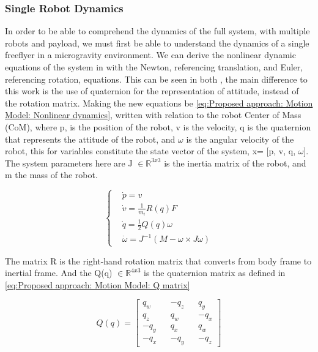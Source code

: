 \subsubsection{Single Robot Dynamics}
In order to be able to comprehend the dynamics of the full system, with multiple robots and payload, we must first be able to understand the dynamics of a single freeflyer in a microgravity environment. We can derive the nonlinear dynamic equations of the system in with the Newton, referencing translation, and Euler, referencing rotation, equations. This can be seen in both \cite{roque2016space}, the main difference to this work is the use of quaternion for the representation of attitude, instead of the rotation matrix. Making the new equations be \ref{eq:Proposed approach: Motion Model: Nonlinear dynamics}, written with relation to the robot Center of Mass (CoM), where p, is the position of the robot, v is the velocity, q is the quaternion that represents the attitude of the robot, and $\omega$ is the angular velocity of the robot, this for variables constitute the state vector of the system, x= [p, v, q, $\omega$]. The system parameters here are J $\in \mathbb{R}^{3x3}$ is the inertia matrix of the robot, and m the mass of the robot.

\begin{equation}
    \begin{cases}
        &\dot{p} = v \\
        &\dot{v} =\frac{1}{m_i} R(q)F \\
        &\dot{q} = \frac{1}{2}Q(q) \omega \\ 
        &\dot{\omega} = J^{-1} \left(M -\omega \times J\omega \right) 
    \end{cases}
    \label{eq:Proposed approach: Motion Model: Nonlinear dynamics}
\end{equation}

The matrix R is the right-hand rotation matrix that converts from body frame to inertial frame. And the Q(q) $\in \mathbb{R}^{4x3}$ is the quaternion matrix as defined in \ref{eq:Proposed approach: Motion Model: Q matrix}

\begin{equation}
    Q\left(q\right) = 
    \begin{bmatrix}
        q_w && -q_z && q_y \\
        q_z && q_w && -q_x \\
        -q_y && q_x && q_w \\
        -q_x && -q_y && -q_z
    \end{bmatrix}
    \label{eq:Proposed approach: Motion Model: Q matrix}
\end{equation}

